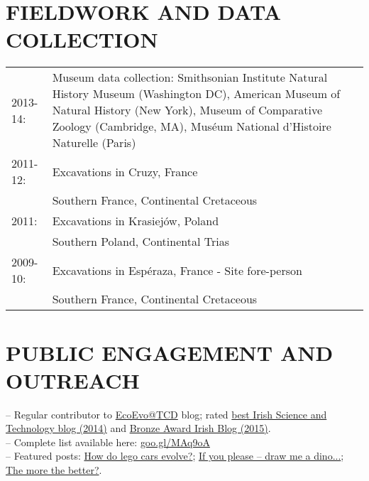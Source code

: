 \documentclass[10pt,a4paper]{article}
\begin{document}
{%
\section{FIELDWORK AND DATA COLLECTION}
\begin{tabular}{lp{14cm}}
2013-14: & Museum data collection: Smithsonian Institute Natural History Museum (Washington DC), American Museum of Natural History (New York), Museum of Comparative Zoology (Cambridge, MA), Mus\'{e}um National d'Histoire Naturelle (Paris) \\
2011-12: & Excavations in Cruzy, France \\
& Southern France, Continental Cretaceous\\
2011: & Excavations in Krasiej\'{o}w, Poland\\
& Southern Poland, Continental Trias\\
2009-10: & Excavations in Esp\'{e}raza, France - Site fore-person\\
& Southern France, Continental Cretaceous\\
\end{tabular}
\bigskip

\section{PUBLIC ENGAGEMENT AND OUTREACH}
-- Regular contributor to \href{http://www.ecoevoblog.com/}{EcoEvo@TCD} blog; rated \href{http://www.ecoevoblog.com/2014/10/06/blog-awards-winners-2014/}{best Irish Science and Technology blog (2014)} and \href{http://www.blogawardsireland.com/wp-content/uploads/2015/09/Blog-Awards-Ireland-2015-Finalists-Company.pdf}{Bronze Award Irish Blog (2015)}. \\
-- Complete list available here: \href{http://tguillerme.github.io/outreach.html}{goo.gl/MAq9oA}\\
-- Featured posts: \href{http://www.ecoevoblog.com/2013/11/04/how-do-lego-cars-evolve/}{How do lego cars evolve?}; \href{http://www.ecoevoblog.com/2013/06/04/if-you-please-draw-me-a-dino/}{If you please -- draw me a dino...}; \href{http://www.ecoevoblog.com/2015/02/06/the-more-the-better/}{The more the better?}.

}
\end{document}
